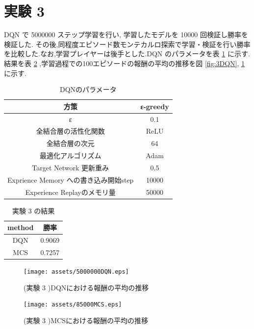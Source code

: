 \documentclass{jarticle}     %
\begin{document}
\section{実験 3}
DQN で 5000000 ステップ学習を行い, 学習したモデルを 10000 回検証し勝率を検証した. その後,同程度エピソード数モンテカルロ探索で学習・検証を行い勝率を比較した.なお,学習プレイヤーは後手とした.DQN のパラメータを表 \ref{table:updateparam} に示す.
結果を表 \ref{table:jikkenDQN} ,学習過程での100エピソードの報酬の平均の推移を図 \ref{fig:3DQN}, \ref{fig:3MCS} に示す.

\begin{table}[H]
  \centering
  \caption{DQNのパラメータ}
  \label{table:updateparam}
  \begin{tabular}{|c||c|}
  \hline
  方策                 & ε-greedy \\ \hline
  ε                      & 0.1      \\ \hline
  全結合層の活性化関数             & ReLU     \\ \hline
  全結合層の次元                & 64       \\ \hline
  最適化アルゴリズム              & Adam     \\ \hline
  Target Network 更新重み              & 0.5     \\ \hline
  Exprience Memory への書き込み開始step & 10000 \\ \hline
  Experience Replayのメモリ量 & 50000  \\ \hline
  \end{tabular}
  \end{table}

\begin{table}[H]
  \centering
  \caption{実験 3 の結果}
  \label{table:jikkenDQN}
  \begin{tabular}{|c|c|}
  \hline
  method & 勝率     \\ \hline
  DQN      & 0.9069 \\ \hline
  MCS      & 0.7257 \\ \hline
  \end{tabular}
  \end{table}

  \begin{figure}[H]
    \begin{minipage}[b]{0.52\linewidth}
      \centering
      \texttt{[image: assets/5000000DQN.eps]}
      \caption{(実験 3 )DQNにおける報酬の平均の推移}
      \label{fig:3DQN}
    \end{minipage}
    \begin{minipage}[b]{0.52\linewidth}
      \centering
      \texttt{[image: assets/85000MCS.eps]}
      \caption{(実験 3 )MCSにおける報酬の平均の推移}
      \label{fig:3MCS}
    \end{minipage}
  \end{figure}
\end{document}
